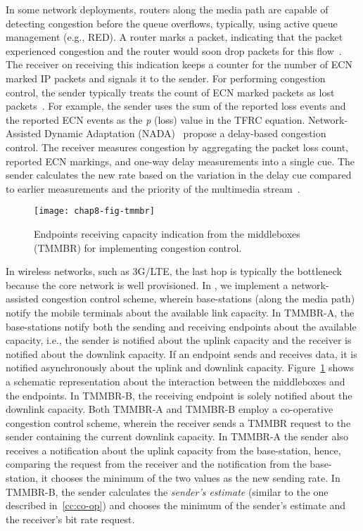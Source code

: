 
In some network deployments, routers along the media path are capable of
detecting congestion before the queue overflows, typically, using active queue
management (e.g., RED). A router marks a packet, indicating that the packet
experienced congestion and the router would soon drop packets for this
flow~\cite{rfc3168}. The receiver on receiving this indication keeps a counter
for the number of ECN marked IP packets and signals it to the sender. For
performing congestion control, the sender typically treats the count of ECN
marked packets as lost packets~\cite{rfc6679}. For example, the sender uses
the sum of the reported loss events and the reported ECN events as the
\emph{p} (loss) value in the TFRC equation. Network-Assisted Dynamic
Adaptation (NADA)~\cite{rmcat-nada} propose a delay-based congestion control.
The receiver measures congestion by aggregating the packet loss count,
reported ECN markings, and one-way delay measurements into a single cue. The
sender calculates the new rate based on the variation in the delay cue
compared to earlier measurements and the priority of the multimedia
stream~\cite{pv-nada}.

\begin{figure}
\texttt{[image: chap8-fig-tmmbr]}
  \caption{Endpoints receiving capacity indication from the middleboxes
  (TMMBR) for implementing congestion control.}
\label{fig:cc:tmmbrab}
\end{figure}

In wireless networks, such as 3G/LTE, the last hop is typically the bottleneck
because the core network is well provisioned. In , we
implement a network-assisted congestion control scheme, wherein base-stations
(along the media path) notify the mobile terminals about the available link
capacity. In TMMBR-A, the base-stations notify both the sending and receiving
endpoints about the available capacity, i.e., the sender is notified about the
uplink capacity and the receiver is notified about the downlink capacity. If
an endpoint sends and receives data, it is notified asynchronously about the
uplink and downlink capacity. Figure~\ref{fig:cc:tmmbrab} shows a schematic
representation about the interaction between the middleboxes and the
endpoints. In TMMBR-B, the receiving endpoint is solely notified about the
downlink capacity. Both TMMBR-A and TMMBR-B employ a co-operative congestion
control scheme, wherein the receiver sends a TMMBR request to the sender
containing the current downlink capacity. In TMMBR-A the sender also receives
a notification about the uplink capacity from the base-station, hence,
comparing the request from the receiver and the notification from the base-station, 
it chooses the minimum of the two values as the new sending rate. In
TMMBR-B, the sender calculates the \emph{sender's estimate} (similar to the
one described in~\ref{cc:co-op}) and chooses the minimum of the sender's
estimate and the receiver's bit rate request. 


